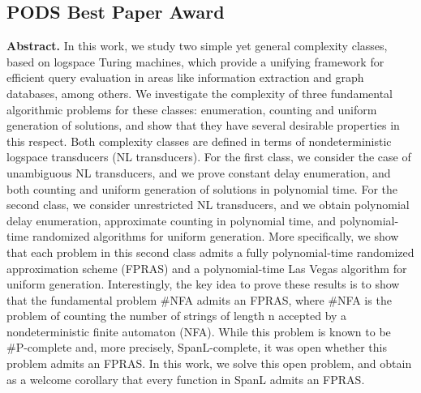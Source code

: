 
\clearpage



\subsection*{PODS Best Paper Award}


\vspace{1mm}

\textbf{Abstract.} In this work, we study two simple yet general complexity classes, based on logspace Turing machines, which provide a unifying framework for efficient query evaluation in areas like information extraction and graph databases, among others. We investigate the complexity of three fundamental algorithmic problems for these classes: enumeration, counting and uniform generation of solutions, and show that they have several desirable properties in this respect. Both complexity classes are defined in terms of nondeterministic logspace transducers (NL transducers). For the first class, we consider the case of unambiguous NL transducers, and we prove constant delay enumeration, and both counting and uniform generation of solutions in polynomial time. For the second class, we consider unrestricted NL transducers, and we obtain polynomial delay enumeration, approximate counting in polynomial time, and polynomial-time randomized algorithms for uniform generation. More specifically, we show that each problem in this second class admits a fully polynomial-time randomized approximation scheme (FPRAS) and a polynomial-time Las Vegas algorithm for uniform generation. Interestingly, the key idea to prove these results is to show that the fundamental problem \#NFA admits an FPRAS, where \#NFA is the problem of counting the number of strings of length n accepted by a nondeterministic finite automaton (NFA). While this problem is known to be \#P-complete and, more precisely, SpanL-complete, it was open whether this problem admits an FPRAS. In this work, we solve this open problem, and obtain as a welcome corollary that every function in SpanL admits an FPRAS.



